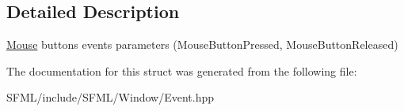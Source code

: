 \subsection{Detailed Description}
\mbox{\hyperlink{classsf_1_1_mouse}{Mouse}} buttons events parameters (Mouse\+Button\+Pressed, Mouse\+Button\+Released) 

\begin{DoxyVerb}\end{DoxyVerb}
 

The documentation for this struct was generated from the following file\+:\begin{DoxyCompactItemize}
\item 
S\+F\+M\+L/include/\+S\+F\+M\+L/\+Window/Event.\+hpp\end{DoxyCompactItemize}
